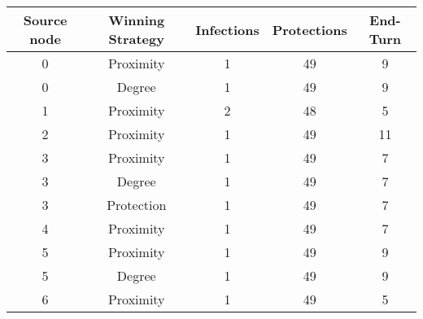 \documentclass[results.tex]{subfiles}
\begin{document}
    \begin{center}
        \begin{tabular}{| c || c | c | c | c |}
            \hline
            {\bfseries Source node} & {\bfseries Winning Strategy} & {\bfseries Infections} & {\bfseries Protections}
            & {\bfseries End-Turn}
            \\  %
            \hline\hline
            0                       & Proximity                    & 1                      & 49                      & 9                    \\
            \hline
            0                       & Degree                       & 1                      & 49                      & 9                    \\
            \hline
            1                       & Proximity                    & 2                      & 48                      & 5                    \\
            \hline
            2                       & Proximity                    & 1                      & 49                      & 11                   \\
            \hline
            3                       & Proximity                    & 1                      & 49                      & 7                    \\
            \hline
            3                       & Degree                       & 1                      & 49                      & 7                    \\
            \hline
            3                       & Protection                   & 1                      & 49                      & 7                    \\
            \hline
            4                       & Proximity                    & 1                      & 49                      & 7                    \\
            \hline
            5                       & Proximity                    & 1                      & 49                      & 9                    \\
            \hline
            5                       & Degree                       & 1                      & 49                      & 9                    \\
            \hline
            6                       & Proximity                    & 1                      & 49                      & 5                    \\

\end{tabular}
\end{center}
\end{document}
